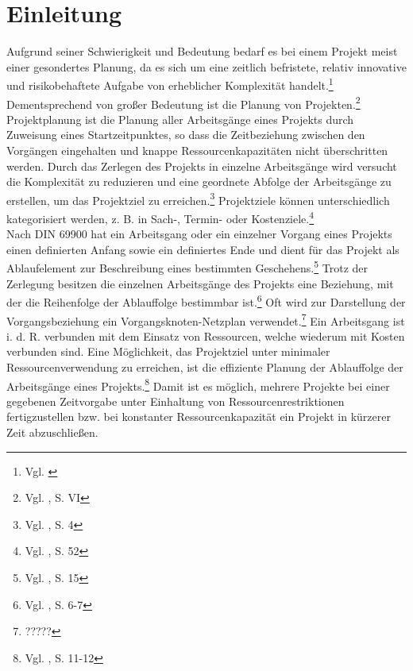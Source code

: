 \documentclass[a4paper,12pt,parskip,bibtotoc,liststotoc]{article}
\begin{document}

\section{Einleitung} \label{start}
Aufgrund seiner Schwierigkeit und Bedeutung bedarf es bei einem Projekt meist einer gesondertes Planung, da es sich um eine zeitlich befristete, relativ innovative und risikobehaftete Aufgabe von erheblicher Komplexität handelt.\footnote{Vgl. \cite{projektdef}} Dementsprechend von großer Bedeutung ist die Planung von Projekten.\footnote{Vgl. \cite{zimmermann2006projektplanung}, S. VI\label{zum}} Projektplanung ist die Planung aller Arbeitsgänge eines Projekts durch Zuweisung eines Startzeitpunktes, so dass die Zeitbeziehung zwischen den Vorgängen eingehalten und knappe Ressourcenkapazitäten nicht überschritten werden. Durch das Zerlegen des Projekts in einzelne Arbeitsgänge wird versucht die Komplexität zu reduzieren und eine geordnete Abfolge der Arbeitsgänge zu erstellen, um das Projektziel zu erreichen.\footnote{Vgl. \cite{zimmermann2006projektplanung}, S. 4} Projektziele können unterschiedlich kategorisiert werden, z. B. in Sach-, Termin- oder Kostenziele.\footnote{Vgl. \cite{felkai2011analysieren}, S. 52}\\

Nach DIN 69900 hat ein Arbeitsgang oder ein einzelner Vorgang eines Projekts einen definierten Anfang sowie ein definiertes Ende und dient für das Projekt als Ablaufelement zur Beschreibung eines bestimmten Geschehens.\footnote{Vgl. \cite{69900D}, S. 15} Trotz der Zerlegung besitzen die einzelnen Arbeitsgänge des Projekts eine Beziehung, mit der die Reihenfolge der Ablauffolge bestimmbar ist.\footnote{Vgl. \cite{kellenbrink2014einfuhrung}, S. 6-7} Oft wird zur Darstellung der Vorgangsbeziehung ein Vorgangsknoten-Netzplan verwendet.\footnote{?????} %
Ein Arbeitsgang ist i. d. R. verbunden mit dem Einsatz von Ressourcen, welche wiederum mit Kosten verbunden sind. Eine Möglichkeit, das Projektziel unter minimaler Ressourcenverwendung zu erreichen, ist die effiziente Planung der Ablauffolge der Arbeitsgänge eines Projekts.\footnote{Vgl. \cite{bartels2009projektplanung}, S. 11-12} Damit ist es möglich, mehrere Projekte bei einer gegebenen Zeitvorgabe unter Einhaltung von Ressourcenrestriktionen fertigzustellen bzw. bei konstanter Ressourcenkapazität ein Projekt in kürzerer Zeit abzuschließen. \\
\end{document}
